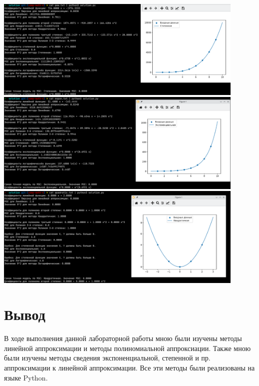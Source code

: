 \begin{center}
\includegraphics[width=0.9\textwidth]{./img/test1.png}
\includegraphics[width=0.9\textwidth]{./img/test2.png}
\includegraphics[width=0.9\textwidth]{./img/test3.png}
\end{center}

\section{Вывод}
В ходе выполнения данной лабораторной работы мною были изучены методы линейной
аппроксимации и методы полиномиальной аппроксиации.
Также мною были изучены методы сведения экспоненциальной, степенной и пр. аппроксимации
к линейной аппроксимации. Все эти методы были реализованы на языке Python.
